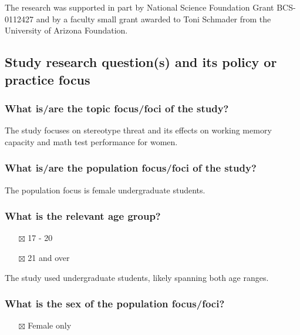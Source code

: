 \documentclass[
  doc, a4paper]{apa7}
\providecommand{\tightlist}{%
  \setlength{\itemsep}{0pt}\setlength{\parskip}{0pt}}
\begin{document}
The research was supported in part by National Science Foundation Grant BCS-0112427 and by a faculty small grant awarded to Toni Schmader from the University of Arizona Foundation.

\subsection{Study research question(s) and its policy or practice focus}\label{study-research-questions-and-its-policy-or-practice-focus}

\subsubsection{What is/are the topic focus/foci of the study?}\label{what-isare-the-topic-focusfoci-of-the-study}

The study focuses on stereotype threat and its effects on working memory capacity and math test performance for women.

\subsubsection{What is/are the population focus/foci of the study?}\label{what-isare-the-population-focusfoci-of-the-study}

The population focus is female undergraduate students.

\subsubsection{What is the relevant age group?}\label{what-is-the-relevant-age-group}

\begin{itemize}
\tightlist
\item[$\boxtimes$]
  17 - 20
\item[$\boxtimes$]
  21 and over
\end{itemize}

The study used undergraduate students, likely spanning both age ranges.

\subsubsection{What is the sex of the population focus/foci?}\label{what-is-the-sex-of-the-population-focusfoci}

\begin{itemize}
\tightlist
\item[$\boxtimes$]
  Female only
\end{itemize}
\end{document}

